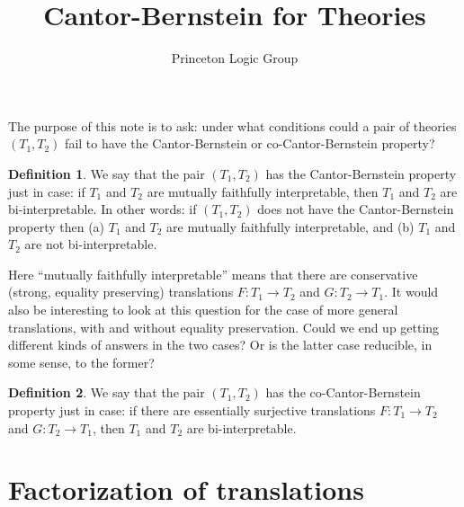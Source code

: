 \documentclass[12pt]{article}
\title{Cantor-Bernstein for Theories}
\author{Princeton Logic Group}
\theoremstyle{definition}
\newtheorem*{defn}{Definition}
\theoremstyle{remark}
\newcommand{\3}{\mathcal}
\begin{document}


\maketitle

The purpose of this note is to ask: under what conditions could a pair
of theories $(T_1,T_2)$ fail to have the Cantor-Bernstein or
co-Cantor-Bernstein property?

\begin{defn} We say that the pair $(T_1,T_2)$ has the Cantor-Bernstein
  property just in case: if $T_1$ and $T_2$ are mutually faithfully
  interpretable, then $T_1$ and $T_2$ are bi-interpretable. In other
  words: if $(T_1,T_2)$ does not have the Cantor-Bernstein property
  then (a) $T_1$ and $T_2$ are mutually faithfully interpretable, and
  (b) $T_1$ and $T_2$ are not bi-interpretable. \end{defn}

Here ``mutually faithfully interpretable'' means that there are
conservative (strong, equality preserving) translations $F:T_1\to T_2$
and $G:T_2\to T_1$. It would also be interesting to look at this
question for the case of more general translations, with and without
equality preservation. Could we end up getting different kinds of
answers in the two cases? Or is the latter case reducible, in some
sense, to the former?

\begin{defn} We say that the pair $(T_1,T_2)$ has the
  co-Cantor-Bernstein property just in case: if there are essentially
  surjective translations $F:T_1\to T_2$ and $G:T_2\to T_1$, then
  $T_1$ and $T_2$ are bi-interpretable. \end{defn}

\newcommand{\2}{\mathsf}

\section{Factorization of translations}
\end{document}
